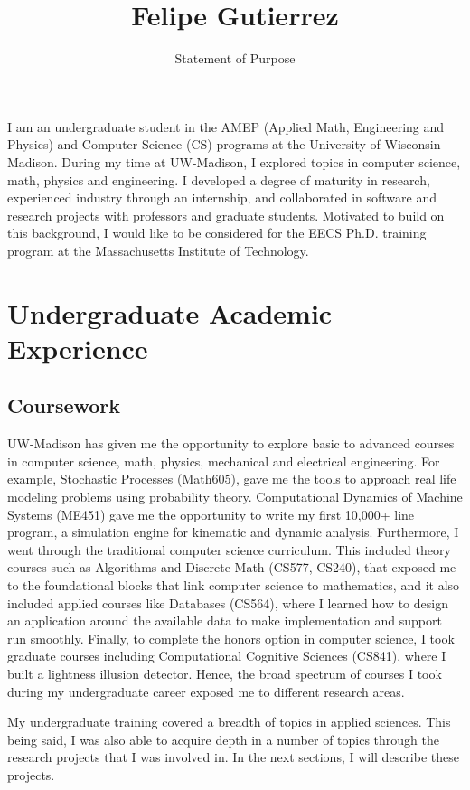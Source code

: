 \documentclass{article}
\title{Felipe Gutierrez}
\date{}
\author{Statement of Purpose}
\theoremstyle{definition}
\begin{document}
\maketitle 

I am an undergraduate student in the AMEP (Applied Math, Engineering and Physics) and Computer Science (CS) programs at the University of Wisconsin-Madison. During my time at UW-Madison, I explored topics in computer science, math, physics and engineering. I developed a degree of maturity in research, experienced industry through an internship, and collaborated in software and research projects with professors and graduate students. Motivated to build on this background, I would like to be considered for the EECS Ph.D. training program at the Massachusetts Institute of Technology.

\section*{Undergraduate Academic Experience}

\subsection*{Coursework}
UW-Madison has given me the opportunity to explore basic to advanced courses in computer science, math, physics, mechanical and electrical engineering. For example, Stochastic Processes (Math605), gave me the tools to approach real life modeling problems using probability theory. Computational Dynamics of Machine Systems (ME451) gave me the opportunity to write my first 10,000+ line program, a simulation engine for kinematic and dynamic analysis. Furthermore, I went through the traditional computer science curriculum. This included theory courses such as Algorithms and Discrete Math (CS577, CS240), that exposed me to the foundational blocks that link computer science to mathematics, and it also included applied courses like Databases (CS564), where I learned how to design an application around the available data to make implementation and support run smoothly. Finally, to complete the honors option in computer science, I took graduate courses including Computational Cognitive Sciences (CS841), where I built a lightness illusion detector. Hence, the broad spectrum of courses I took during my undergraduate career exposed me to different research areas. \newline

My undergraduate training covered a breadth of topics in applied sciences. This being said, I was also able to acquire depth in a number of topics through the research projects that I was involved in. In the next sections, I will describe these projects.
\end{document}
